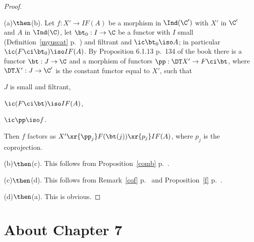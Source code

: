 \documentclass[12pt]{article}
\theoremstyle{remark}
\theoremstyle{definition}
\begin{document}
\begin{proof}\ 

\nn(a)$\then$(b). Let $f:X'\to IF(A)$ be a morphism in $\Ind(\C')$ with $X'$ in $\C'$ and $A$ in $\Ind(\C)$, let $\bt_0:I\to\C$ be a functor with $I$ small (Definition~\ref{myuscat} p.~) and filtrant and $\ic\bt_0\iso A$; in particular $\ic(F\ci\bt_0)\iso IF(A)$. By Proposition 6.1.13 p.~134 of the book there is a functor $\bt:J\to\C$ and a morphism of functors $\pp:\DT X'\to F\ci\bt$, where $\DT X':J\to\C'$ is the constant functor equal to $X'$, such that 

$J$ is small and filtrant, 

$\ic(F\ci\bt)\iso IF(A)$, 

$\ic\pp\iso f$. 

\nn Then $f$ factors as $X'\xr{\pp_j}F(\bt(j))\xr{p_j}IF(A)$, where $p_j$ is the coprojection.

\nn(b)$\then$(c). This follows from Proposition~\ref{comb} p.~. 

\nn(c)$\then$(d). This follows from Remark~\ref{cof} p.~ and Proposition~\ref{f} p.~. 

\nn(d)$\then$(a). This is obvious.
\end{proof}


\section{About Chapter 7}

\end{document}
